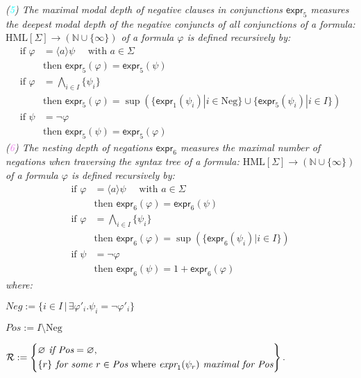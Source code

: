 \begin{isabellebody}
\begin{isamarkuptext}
\textit{
(\textcolor{cyan}{5}) The \textnormal{maximal modal depth of negative clauses in conjunctions} $\textsf{expr}_5$ measures the deepest modal depth of the negative conjuncts of all conjunctions of a formula: $\text{HML}[\Sigma] \rightarrow (\mathbb{N} \cup \{\infty\})$ of a formula $\varphi$ is defined recursively by:
}
\textit{
\begin{align*}
    \text{if } \varphi &= \langle a \rangle \psi \quad \text{ with } a \in \Sigma \\
    & \text{then } \textsf{expr}_5(\varphi) = \textsf{expr}_5(\psi) \\
    \text{if } \varphi &= \bigwedge_{i \in I} \{ \psi_i \} \\
    & \text{then } \textsf{expr}_5(\varphi) = \sup(\{\textsf{expr}_1(\psi_i)| i \in \text{Neg}\}\cup \{\textsf{expr}_5(\psi_i)|i \in I\}) \\
    \text{if } \psi &= \neg \varphi \\
    & \text{then } \textsf{expr}_5(\psi) = \textsf{expr}_5(\varphi)
\end{align*}
}
\textit{(\textcolor{violet}{6}) The \textnormal{nesting depth of negations} $\textsf{expr}_{6}$ measures the maximal number of negations when traversing the syntax tree of a formula: $\text{HML}[\Sigma] \rightarrow (\mathbb{N} \cup \{\infty\})$ of a formula $\varphi$ is defined recursively by:}
\textit{
\begin{align*}
    \text{if } \varphi &= \langle a \rangle \psi \quad \text{ with } a \in \Sigma \\
    & \text{then } \textsf{expr}_6(\varphi) = \textsf{expr}_6(\psi) \\
    \text{if } \varphi &= \bigwedge_{i \in I} \{ \psi_i \} \\
    & \text{then } \textsf{expr}_6(\varphi) = \sup(\{\textsf{expr}_6(\psi_i)| i \in I\}) \\
    \text{if } \psi &= \neg \varphi \\
    & \text{then } \textsf{expr}_6(\psi) = 1 + \textsf{expr}_6(\varphi)
\end{align*}
}
\textit{where:}

$\textit{Neg} := \{i \in I \, | \, \exists \varphi'_i. \psi_i = \neg \varphi'_i\}$

$\textit{Pos} := I \setminus \text{Neg}$

$\mathcal{R} := \left\{
\begin{aligned}
&\varnothing \textit{ if } \textit{Pos} = \varnothing, \\
&\{ r \} \textit{ for some } r \in \textit{Pos} \text{ where } \textit{expr}_1(\psi_r) \textit{ maximal for \textit{Pos}}
\end{aligned}
\right\}.$


\end{isamarkuptext}
\end{isabellebody}

